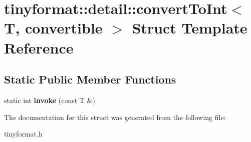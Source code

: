 \hypertarget{structtinyformat_1_1detail_1_1convertToInt}{}\section{tinyformat\+:\+:detail\+:\+:convert\+To\+Int$<$ T, convertible $>$ Struct Template Reference}
\label{structtinyformat_1_1detail_1_1convertToInt}
\subsection*{Static Public Member Functions}
\begin{DoxyCompactItemize}
\item 
\mbox{\label{structtinyformat_1_1detail_1_1convertToInt_a1e1c0d85c6afc3bb21d2bc9458b3feb1}} 
static int {\bfseries invoke} (const T \&)
\end{DoxyCompactItemize}


The documentation for this struct was generated from the following file\+:\begin{DoxyCompactItemize}
\item 
tinyformat.\+h\end{DoxyCompactItemize}
